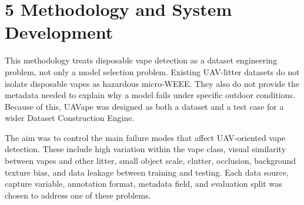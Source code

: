 \section*{5 Methodology and System Development}

This methodology treats disposable vape detection as a dataset engineering problem, not only a model selection problem. Existing UAV-litter datasets do not isolate disposable vapes as hazardous micro-WEEE. They also do not provide the metadata needed to explain why a model fails under specific outdoor conditions. Because of this, UAVape was designed as both a dataset and a test case for a wider Dataset Construction Engine.

The aim was to control the main failure modes that affect UAV-oriented vape detection. These include high variation within the vape class, visual similarity between vapes and other litter, small object scale, clutter, occlusion, background texture bias, and data leakage between training and testing. Each data source, capture variable, annotation format, metadata field, and evaluation split was chosen to address one of these problems.
